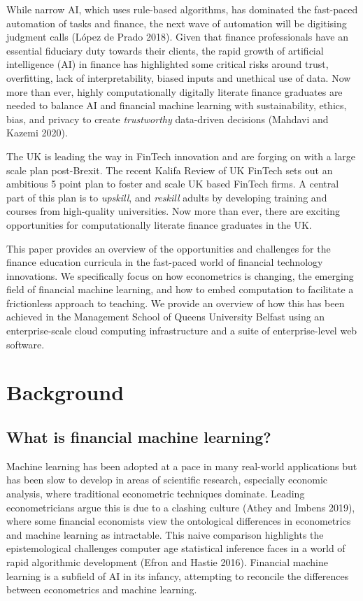 \documentclass{article}
\begin{document}
While narrow AI, which uses rule-based algorithms, has dominated the
fast-paced automation of tasks and finance, the next wave of automation
will be digitising judgment calls (López de Prado 2018). Given that
finance professionals have an essential fiduciary duty towards their
clients, the rapid growth of artificial intelligence (AI) in finance has
highlighted some critical risks around trust, overfitting, lack of
interpretability, biased inputs and unethical use of data. Now more than
ever, highly computationally digitally literate finance graduates are
needed to balance AI and financial machine learning with sustainability,
ethics, bias, and privacy to create \emph{trustworthy} data-driven
decisions (Mahdavi and Kazemi 2020).

The UK is leading the way in FinTech innovation and are forging on with
a large scale plan post-Brexit. The recent Kalifa Review of UK FinTech
sets out an ambitious 5 point plan to foster and scale UK based FinTech
firms. A central part of this plan is to \emph{upskill}, and
\emph{reskill} adults by developing training and courses from
high-quality universities. Now more than ever, there are exciting
opportunities for computationally literate finance graduates in the UK.

This paper provides an overview of the opportunities and challenges for
the finance education curricula in the fast-paced world of financial
technology innovations. We specifically focus on how econometrics is
changing, the emerging field of financial machine learning, and how to
embed computation to facilitate a frictionless approach to teaching. We
provide an overview of how this has been achieved in the Management
School of Queens University Belfast using an enterprise-scale cloud
computing infrastructure and a suite of enterprise-level web software.

\hypertarget{background}{%
\section{Background}\label{background}}

\hypertarget{what-is-financial-machine-learning}{%
\subsection{What is financial machine
learning?}\label{what-is-financial-machine-learning}}

Machine learning has been adopted at a pace in many real-world
applications but has been slow to develop in areas of scientific
research, especially economic analysis, where traditional econometric
techniques dominate. Leading econometricians argue this is due to a
clashing culture (Athey and Imbens 2019), where some financial
economists view the ontological differences in econometrics and machine
learning as intractable. This naive comparison highlights the
epistemological challenges computer age statistical inference faces in a
world of rapid algorithmic development (Efron and Hastie 2016).
Financial machine learning is a subfield of AI in its infancy,
attempting to reconcile the differences between econometrics and machine
learning.
\end{document}

